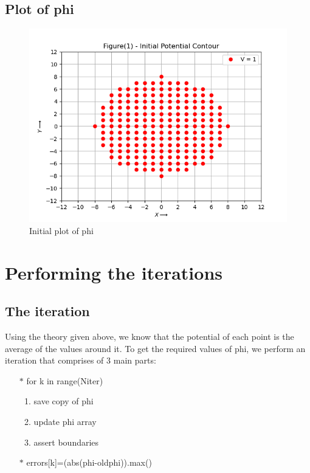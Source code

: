 \documentclass[11pt]{article}
\begin{document}
\subsection{Plot of phi}
\begin{figure}[H]
    \centering
    \includegraphics[scale = 1]{Figure_1.png}
    \caption{Initial plot of phi}
\end{figure}

\section{Performing the iterations}
\subsection{The iteration}
Using the theory given above, we know that the potential of each point is the average of the values around it. To get the required values of phi, we perform an iteration that comprises of 3 main parts:
\begin{itemize}
    \item [$\ast$] for k in range(Niter)
    \begin{enumerate}
        \item  save copy of phi
        \item  update phi array
        \item  assert boundaries
    \end{enumerate}
    \item [$\ast$] errors[k]=(abs(phi-oldphi)).max()
\end{itemize}
\end{document}
